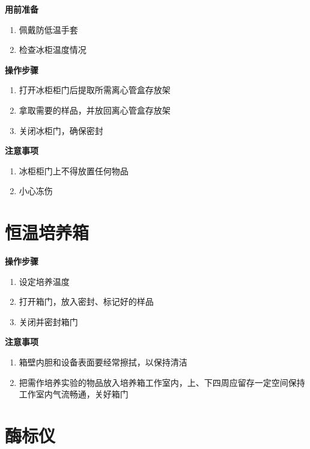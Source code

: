 \documentclass[
]{book}
\providecommand{\tightlist}{%
  \setlength{\itemsep}{0pt}\setlength{\parskip}{0pt}}
\begin{document}
\textbf{用前准备}

\begin{enumerate}
\def\labelenumi{\arabic{enumi}.}
\tightlist
\item
  佩戴防低温手套
\item
  检查冰柜温度情况
\end{enumerate}

\textbf{操作步骤}

\begin{enumerate}
\def\labelenumi{\arabic{enumi}.}
\tightlist
\item
  打开冰柜柜门后提取所需离心管盒存放架
\item
  拿取需要的样品，并放回离心管盒存放架
\item
  关闭冰柜门，确保密封
\end{enumerate}

\textbf{注意事项}

\begin{enumerate}
\def\labelenumi{\arabic{enumi}.}
\tightlist
\item
  冰柜柜门上不得放置任何物品
\item
  小心冻伤
\end{enumerate}

\hypertarget{ux6052ux6e29ux57f9ux517bux7bb1}{%
\section{恒温培养箱}\label{ux6052ux6e29ux57f9ux517bux7bb1}}

\textbf{操作步骤}

\begin{enumerate}
\def\labelenumi{\arabic{enumi}.}
\tightlist
\item
  设定培养温度
\item
  打开箱门，放入密封、标记好的样品
\item
  关闭并密封箱门
\end{enumerate}

\textbf{注意事项}

\begin{enumerate}
\def\labelenumi{\arabic{enumi}.}
\tightlist
\item
  箱壁内胆和设备表面要经常擦拭，以保持清洁
\item
  把需作培养实验的物品放入培养箱工作室内，上、下四周应留存一定空间保持工作室内气流畅通，关好箱门
\end{enumerate}

\hypertarget{ux9176ux6807ux4eea}{%
\section{酶标仪}\label{ux9176ux6807ux4eea}}
\end{document}
